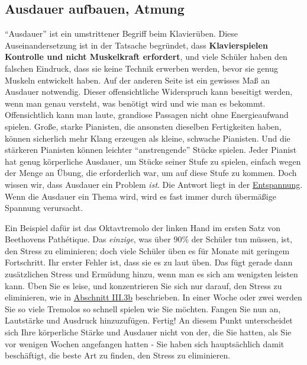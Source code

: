 
\subsection{Ausdauer aufbauen, Atmung}
\label{c1ii21}

\enquote{Ausdauer} ist ein umstrittener Begriff beim Klavierüben.
Diese Auseinandersetzung ist in der Tatsache begründet, dass \textbf{Klavierspielen Kontrolle und nicht Muskelkraft erfordert}, und viele Schüler haben den falschen Eindruck, dass sie keine Technik erwerben werden, bevor sie genug Muskeln entwickelt haben.
Auf der anderen Seite ist ein gewisses Maß an Ausdauer notwendig.
Dieser offensichtliche Widerspruch kann beseitigt werden, wenn man genau versteht, was benötigt wird und wie man es bekommt.
Offensichtlich kann man laute, grandiose Passagen nicht ohne Energieaufwand spielen.
Große, starke Pianisten, die ansonsten dieselben Fertigkeiten haben, können sicherlich mehr Klang erzeugen als kleine, schwache Pianisten.
Und die stärkeren Pianisten können leichter \enquote{anstrengende} Stücke spielen.
Jeder Pianist hat genug körperliche Ausdauer, um Stücke seiner Stufe zu spielen, einfach wegen der Menge an Übung, die erforderlich war, um auf diese Stufe zu kommen.
Doch wissen wir, dass Ausdauer ein Problem \textit{ist}.
Die Antwort liegt in der \hyperref[c1ii14]{Entspannung}.
Wenn die Ausdauer ein Thema wird, wird es fast immer durch übermäßige Spannung verursacht.

Ein Beispiel dafür ist das Oktavtremolo der linken Hand im ersten Satz von Beethovens Pathétique.
Das \textit{einzige}, was über 90\% der Schüler tun müssen, ist, den Stress zu eliminieren; doch viele Schüler üben es für Monate mit geringem Fortschritt.
Ihr erster Fehler ist, dass sie es zu laut üben.
Das fügt gerade dann zusätzlichen Stress und Ermüdung hinzu, wenn man es sich am wenigsten leisten kann.
Üben Sie es leise, und konzentrieren Sie sich nur darauf, den Stress zu eliminieren, wie in \hyperref[c1iii3b]{Abschnitt III.3b} beschrieben.
In einer Woche oder zwei werden Sie so viele Tremolos so schnell spielen wie Sie möchten.
Fangen Sie nun an, Lautstärke und Ausdruck hinzuzufügen. Fertig!
An diesem Punkt unterscheidet sich Ihre körperliche Stärke und Ausdauer nicht von der, die Sie hatten, als Sie vor wenigen Wochen angefangen hatten - Sie haben sich hauptsächlich damit beschäftigt, die beste Art zu finden, den Stress zu eliminieren.

